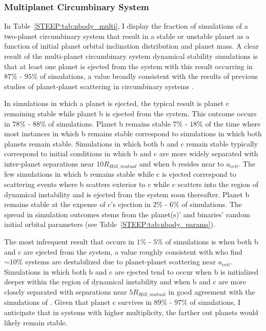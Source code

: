\subsubsection{Multiplanet Circumbinary System}

In Table~\ref{STEEP:tab:nbody_multi}, I display the fraction of simulations of a two-planet circumbinary system that result in a stable or unstable planet as a function of initial planet orbital inclination distribution and planet mass. A clear result of the multi-planet circumbinary system dynamical stability simulations is that at least one planet is ejected from the system with this result occurring in $87\%$ - $95\%$ of simulations, a value broadly consistent with the results of previous studies of planet-planet scattering in circumbinary systems \citep[e.g.][]{Sutherland2016,Smullen2016,Gong2017,Gong2017b}. 

In simulations in which a planet is ejected, the typical result is planet c remaining stable while planet b is ejected from the system.  This outcome occurs in $78\%$ - $88\%$ of simulations.  Planet b remains stable $7\%$ - $18\%$ of the time where most instances in which b remains stable correspond to simulations in which both planets remain stable.  Simulations in which both b and c remain stable typically correspond to initial conditions in which b and c are more widely separated with inter-planet separations near $10 R_{Hill,mutual}$ and when b resides near to $a_{crit}$.  The few simulations in which b remains stable while c is ejected correspond to scattering events where b scatters exterior to c while c scatters into the region of dynamical instability and is ejected from the system soon thereafter.  Planet b remains stable at the expense of c's ejection in $2\%$ - $6\%$ of simulations.  The spread in simulation outcomes stems from the planet(s)' and binaries' random initial orbital parameters (see Table~\ref{STEEP:tab:nbody_params}).

The most infrequent result that occurs in $1\%$ - $5\%$ of simulations is when both b and c are ejected from the system, a value roughly consistent with \citet{Gong2017b} who find ${\sim 10\%}$ systems are destabilized due to planet-planet scattering near $a_{crit}$.  Simulations in which both b and c are ejected tend to occur when b is initialized deeper within the region of dynamical instability and when b and c are more closely separated with separations near $5 R_{Hill,mutual}$ in good agreement with the simulations of \citet{Kratter2014}.  Given that planet c survives in $89\%$ - $97\%$ of simulations, I anticipate that in systems with higher multiplicity, the farther out planets would likely remain stable.

